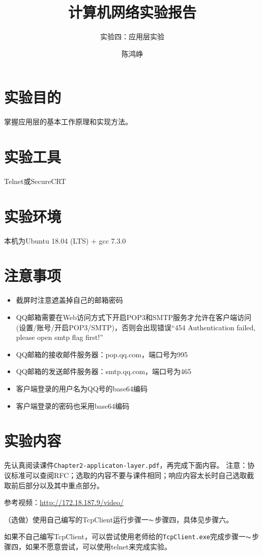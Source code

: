 \documentclass[logo,reportComp]{thesis}
\title{计算机网络实验报告}
\subtitle{实验四：应用层实验}
\author{陈鸿峥}
\begin{document}
\maketitle

\section{实验目的}
掌握应用层的基本工作原理和实现方法。

\section{实验工具}
Telnet或SecureCRT

\section{实验环境}
本机为Ubuntu 18.04 (LTS) + gcc 7.3.0

\section{注意事项}
\begin{itemize}
    \item 截屏时注意遮盖掉自己的邮箱密码
    \item QQ邮箱需要在Web访问方式下开启POP3和SMTP服务才允许在客户端访问(设置/账号/开启POP3/SMTP)，否则会出现错误``454 Authentication failed, please open smtp flag first!''
    \item QQ邮箱的接收邮件服务器：pop.qq.com，端口号为995
    \item QQ邮箱的发送邮件服务器：smtp.qq.com，端口号为465
    \item 客户端登录的用户名为QQ号的base64编码
    \item 客户端登录的密码也采用base64编码
\end{itemize}

\section{实验内容}
先认真阅读课件\verb'Chapter2-applicaton-layer.pdf'，再完成下面内容。
注意：协议标准可以查阅RFC；选取的内容不要与课件相同；响应内容太长时自己选取截取前后部分以及其中重点部分。

参考视频：\url{http://172.18.187.9/video/}

（选做）使用自己编写的TcpClient运行步骤一$\thicksim$步骤四，具体见步骤六。

如果不自己编写TcpClient，可以尝试使用老师给的\verb'TcpClient.exe'完成步骤一$\thicksim$步骤四，如果不愿意尝试，可以使用telnet来完成实验。
\end{document}
